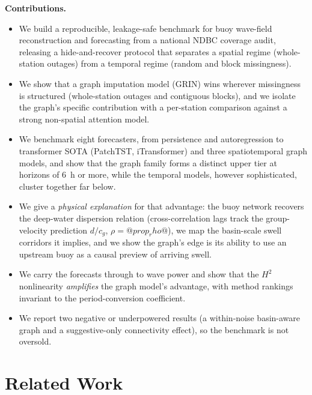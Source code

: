 \documentclass[11pt]{article}
\begin{document}
\noindent\textbf{Contributions.}
\begin{itemize}
  \item We build a reproducible, leakage-safe benchmark for buoy wave-field
  reconstruction and forecasting from a national NDBC coverage audit, releasing
  a hide-and-recover protocol that separates a spatial regime (whole-station
  outages) from a temporal regime (random and block missingness).
  \item We show that a graph imputation model (GRIN) wins wherever missingness
  is structured (whole-station outages and contiguous blocks), and we isolate the
  graph's specific contribution with a per-station comparison against a strong
  non-spatial attention model.
  \item We benchmark eight forecasters, from persistence and autoregression to
  transformer SOTA (PatchTST, iTransformer) and three spatiotemporal graph models,
  and show that the graph family forms a distinct upper tier at horizons of 6~h or
  more, while the temporal models, however sophisticated, cluster together far
  below.
  \item We give a \emph{physical explanation} for that advantage: the buoy network
  recovers the deep-water dispersion relation (cross-correlation lags track the
  group-velocity prediction $d/c_g$, $\rho=@prop_rho@$), we map the basin-scale swell
  corridors it implies, and we show the graph's edge is its ability to use an upstream
  buoy as a causal preview of arriving swell.
  \item We carry the forecasts through to wave power and show that the
  $H^{2}$ nonlinearity \emph{amplifies} the graph model's advantage, with
  method rankings invariant to the period-conversion coefficient.
  \item We report two negative or underpowered results (a within-noise
  basin-aware graph and a suggestive-only connectivity effect), so the benchmark
  is not oversold.
\end{itemize}

\section{Related Work}
\label{sec:related}
\end{document}

